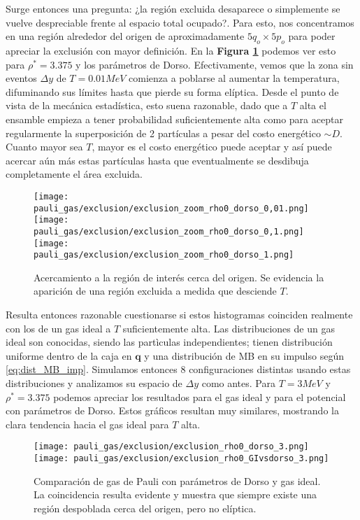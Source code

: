 Surge entonces una pregunta: ¿la región excluida desaparece o simplemente se vuelve despreciable frente al espacio total ocupado?.
Para esto, nos concentramos en una región alrededor del origen de aproximadamente $5q_o\times5p_o$ para poder apreciar la exclusión con mayor definición.
En la \textbf{Figura \ref{fig:exclusion_zoom_rho0_dorso}} podemos ver esto para $\rho^*=3.375$ y los parámetros de Dorso.
Efectivamente, vemos que la zona sin eventos $\Delta y$ de $T=0.01MeV$ comienza a poblarse al aumentar la temperatura, difuminando sus límites hasta que pierde
su forma elíptica.
Desde el punto de vista de la mecánica estadística, esto suena razonable, dado que a $T$ alta el ensamble empieza a tener probabilidad suficientemente alta como para
aceptar regularmente la superposición de 2 partículas a pesar del costo energético $\sim D$.
Cuanto mayor sea $T$, mayor es el costo energético puede aceptar y así puede acercar aún más estas partículas hasta que eventualmente se desdibuja completamente el área excluida.


\begin{figure}[H]
	\centering	%
	\texttt{[image: pauli\_gas/exclusion/exclusion\_zoom\_rho0\_dorso\_0,01.png]}
	\texttt{[image: pauli\_gas/exclusion/exclusion\_zoom\_rho0\_dorso\_0,1.png]}
	\texttt{[image: pauli\_gas/exclusion/exclusion\_zoom\_rho0\_dorso\_1.png]}
	\caption{Acercamiento a la región de interés cerca del origen. Se evidencia la aparición de una región excluida a medida que desciende $T$.}
	\label{fig:exclusion_zoom_rho0_dorso}
\end{figure}

Resulta entonces razonable cuestionarse si estos histogramas coinciden realmente con los de un gas ideal a $T$ suficientemente alta.
Las distribuciones de un gas ideal son conocidas, siendo las part\`iculas independientes; tienen distribución uniforme dentro de la caja en $\mathbf{q}$ y una
distribución de MB en su impulso según \eqref{eq:dist_MB_imp}.
Simulamos entonces 8 configuraciones distintas usando estas distribuciones y analizamos su espacio de $\Delta y$ como antes.
Para $T=3MeV$ y $\rho^*=3.375$ podemos apreciar los resultados para el gas ideal y para el potencial con parámetros de Dorso.
Estos gráficos resultan muy similares, mostrando la clara tendencia hacia el gas ideal para $T$ alta.

\begin{figure}[H]
	\centering	%
	\texttt{[image: pauli\_gas/exclusion/exclusion\_rho0\_dorso\_3.png]}
	\texttt{[image: pauli\_gas/exclusion/exclusion\_rho0\_GIvsdorso\_3.png]}
	\caption{Comparación de gas de Pauli con parámetros de Dorso y gas ideal.
  La coincidencia resulta evidente y muestra que siempre existe una región despoblada cerca del origen, pero no elíptica.}
	\label{fig:exclusion_dorso_vs_GI}
\end{figure}

